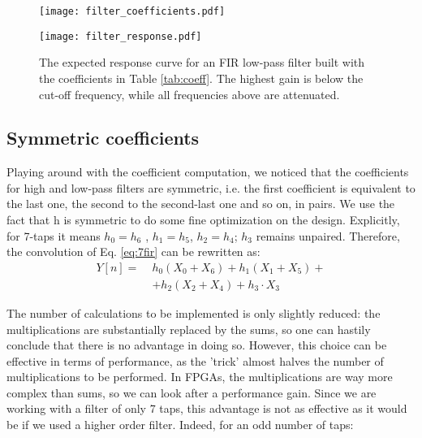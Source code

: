 \begin{figure}[H]
    \centering
    \texttt{[image: filter\_coefficients.pdf]}
    \qquad
\end{figure}

\begin{figure}[H]
    \centering
    \label{fig:response_curve}
    \caption{The expected response curve for an FIR low-pass filter built with the coefficients in Table \ref{tab:coeff}. The highest gain is below the cut-off frequency, while all frequencies above are attenuated. }
    \texttt{[image: filter\_response.pdf]}
    \qquad
\end{figure}




\subsection{Symmetric coefficients}
\label{ssec:symmetric_coefficients}

Playing around with the coefficient computation, we noticed that the coefficients for high and low-pass filters are symmetric, i.e. the first coefficient is equivalent to the last one, the second to the second-last one and so on, in pairs. 
We use the fact that h is symmetric to do some fine optimization on the design. Explicitly, for 7-taps it means $h_0=h_6$ , $h_1=h_5$, $h_2=h_4$; $h_3$ remains unpaired. Therefore, the convolution of Eq. \ref{eq:7fir} can be rewritten as:
\begin{equation}
\begin{split}
    Y[n] = \; & h_0 (X_0+X_6) + h_1(X_1+X_5) + \\ 
           & + h_2(X_2+X_4) + h_3 \cdot X_3
\end{split}
\label{eq:7fir_optimized}
\end{equation}

The number of calculations to be implemented is only slightly reduced: the multiplications are substantially replaced by the sums, so one can hastily conclude that there is no advantage in doing so. However, this choice can be effective in terms of performance, as the 'trick' almost halves the number of multiplications to be performed. In FPGAs, the multiplications are way more complex than sums, so we can look after a performance gain. Since we are working with a filter of only 7 taps, this advantage is not as effective as it would be if we used a higher order filter. Indeed, for an odd number of taps:

